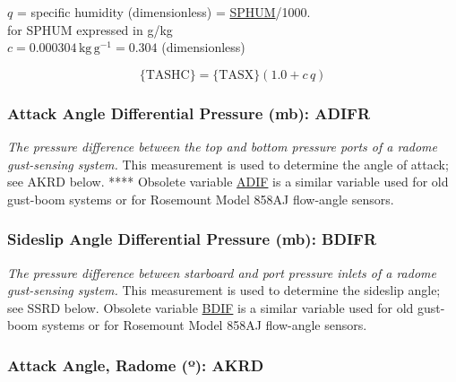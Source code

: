 \documentclass[
]{book}
\begin{document}
\(q\) = specific humidity (dimensionless) = \href{$sphum}{SPHUM}/1000.\\
\hspace*{0.333em}\hspace*{0.333em}\hspace*{0.333em}\hspace*{0.333em}\hspace*{0.333em}\hspace*{0.333em} for SPHUM expressed in g/kg\\
\(c=0.000304\,\mathrm{kg\,g^{-1}}=0.304\) (dimensionless)

\begin{equation}
\mathrm{\{TASHC\}} = \mathrm{\{TASX\}} (1.0 + c\,q)  
\label{eq:TASHC}
\end{equation}

\hypertarget{adifr}{%
\subsubsection*{Attack Angle Differential Pressure (mb): ADIFR}\label{adifr}}

\emph{The pressure difference between the top and bottom pressure ports of a radome gust-sensing system.} This measurement is used to determine the angle of attack; see AKRD below. **** Obsolete variable \uline{ADIF} is a similar variable used for old gust-boom systems or for Rosemount Model 858AJ flow-angle sensors.

\hypertarget{bdifr}{%
\subsubsection*{Sideslip Angle Differential Pressure (mb): BDIFR}\label{bdifr}}

\emph{The pressure difference between starboard and port pressure inlets of a radome gust-sensing system.} This measurement is used to determine the sideslip angle; see SSRD below. Obsolete variable \uline{BDIF} is a similar variable used for old gust-boom systems or for Rosemount Model 858AJ flow-angle sensors.

\hypertarget{akrd}{%
\subsubsection*{\texorpdfstring{Attack Angle, Radome ({º}): AKRD}{Attack Angle, Radome (º): AKRD}}\label{akrd}}
\end{document}
